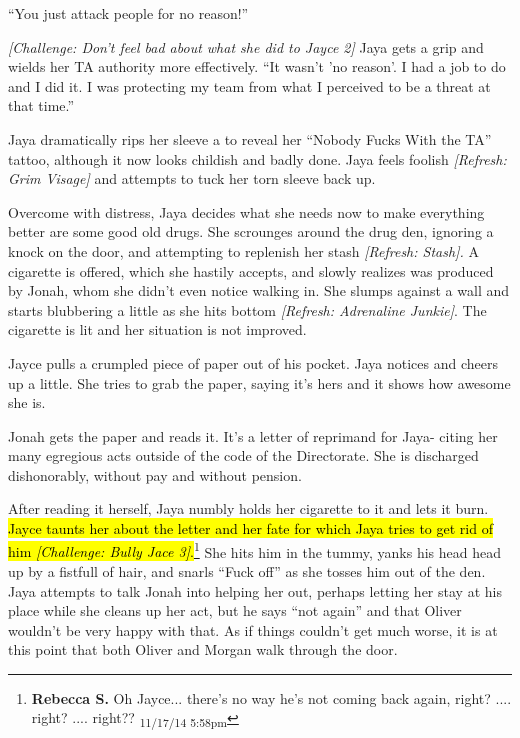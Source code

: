 ``You just attack people for no reason!''



\textit{{[}Challenge: Don't feel bad about what she did to Jayce 2{]}} Jaya gets a grip and wields her TA authority more effectively.  ``It wasn't 'no reason'.  I had a job to do and I did it.  I was protecting my team from what I perceived to be a threat at that time.''



Jaya dramatically rips her sleeve a to reveal her ``Nobody Fucks With the TA'' tattoo, although it now looks childish and badly done.  Jaya feels foolish \textit{{[}Refresh: Grim Visage{]} }and attempts to tuck her torn sleeve back up. 



Overcome with distress, Jaya decides what she needs now to make everything better are some good old drugs.    She scrounges around the drug den, ignoring a knock on the door, and attempting to replenish her stash \textit{{[}Refresh: Stash{]}.  }A cigarette is offered, which she hastily accepts, and slowly realizes was produced by Jonah, whom she didn't even notice walking in.  She slumps against a wall and starts blubbering a little as she hits bottom \textit{{[}Refresh: Adrenaline Junkie{]}}.  The cigarette is lit and her situation is not improved.   



Jayce pulls a crumpled piece of paper out of his pocket.  Jaya notices and cheers up a little.  She tries to grab the paper, saying it's hers and it shows how awesome she is.



Jonah gets the paper and reads it.  It's a letter of reprimand for Jaya- citing her many egregious acts outside of the code of the Directorate.  She is discharged dishonorably, without pay and without pension.



After reading it herself, Jaya numbly holds her cigarette to it and lets it burn.  \hl{Jayce taunts her about the letter and her fate for which Jaya tries to get rid of him \textit{{[}Challenge: Bully Jace 3{]}}.}\footnote{\textbf{Rebecca S. }Oh Jayce... there's no way he's not coming back again, right?  .... right?
....
right?? \textsubscript{11/17/14 5:58pm}} She hits him in the tummy, yanks his head head up by a fistfull of hair, and snarls ``Fuck off'' as she tosses him out of the den.  Jaya attempts to talk Jonah into helping her out, perhaps letting her stay at his place while she cleans up her act, but he says ``not again'' and that Oliver wouldn't be very happy with that.  As if things couldn't get much worse, it is at this point that both Oliver and Morgan walk through the door.  



